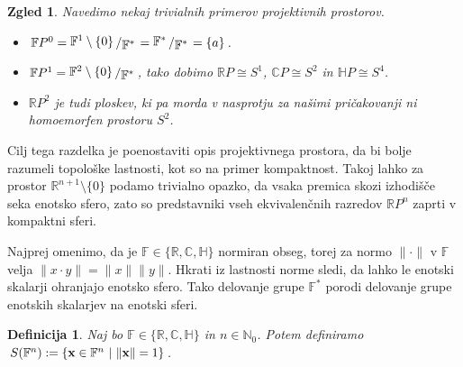 \documentclass[10pt, a4paper]{article}
\newtheorem{defi}[izr]{Definicija}
\newenvironment{noticeB}{%
  \tcolorbox[%
  notitle,
  empty,
  enhanced,  %
  breakable,
  coltext=black,
  colback=white, 
  fontupper=\rmfamily,
  noparskip,
  sharp corners,
  boxrule=-1pt,  %
  frame hidden,
  left=7pt,  %
  right=7pt,
  top=5pt,
  bottom=5pt,
  before skip=2.5ex plus 2pt,
  after skip=2.5ex plus 2pt,
  borderline west = {1.5pt}{-0.1pt}{blue!30!black}, %
  overlay unbroken and last={%
    \draw[color=black, line width=1.25pt]
    ($(frame.south west)+(1.pt, -0.1pt)$) -- ++(2em, 0);
  }
  ]}
{\endtcolorbox}
\newenvironment{definicija}{\begin{noticeB}\begin{defi}}{%
\end{defi}\end{noticeB}}
\newtheorem{zgled}[izr]{Zgled}
\newcommand{\N}{\mathbb {N}}
\newcommand{\R}{\mathbb {R}}
\newcommand{\C}{\mathbb {C}}
\newcommand{\Ha}{\mathbb {H}}
\newcommand{\F}{\mathbb {F}}
\newcommand{\quot}[2]{{\raisebox{0.1em}{$#1$}\left/\raisebox{-0.2em}{$#2$}\right.}}
\begin{document}
\begin{zgled}
  Navedimo nekaj trivialnih primerov projektivnih prostorov.
  \begin{itemize}
    \item $\F P^0 = \quot{\F^1 \setminus \{0\}}{\F^*} = \quot{\F^*}{\F^*} = \{a\}$.
    \item $\F P^1 = \quot{\F^2 \setminus \{0\}}{\F^*}$, tako dobimo $\R P \cong S^1$, $\C P \cong S^2$ in $\Ha P \cong S^4$.
    \item $\R P^2$ je tudi ploskev, ki pa morda v nasprotju za našimi pričakovanji 
    ni homoemorfen prostoru $S^2$.
  \end{itemize}
\end{zgled}

Cilj tega razdelka je poenostaviti opis projektivnega prostora, da bi bolje 
razumeli topološke lastnosti, kot so na primer kompaktnost.
Takoj lahko za prostor $\R^{n + 1} \setminus\{0\}$ podamo trivialno opazko,
da vsaka premica skozi izhodišče seka enotsko sfero,
zato so predstavniki vseh ekvivalenčnih razredov $\R P^n$
zaprti v kompaktni sferi.

Najprej omenimo, da je $\F \in \{\R, \C, \Ha\}$ normiran obseg, torej za normo 
$\| \cdot \|$ v $\F$ velja $\| x \cdot y\| = \|x\| \|y\|$.
Hkrati iz lastnosti norme sledi, da lahko le enotski skalarji ohranjajo enotsko sfero.
Tako delovanje grupe $\F^*$ porodi delovanje grupe enotskih skalarjev na enotski sferi.

\begin{definicija}
  Naj bo $\F \in \{\R, \C, \Ha\}$ in $n \in \N_0$.
  Potem definiramo $S(\F^n) := \{\vb{x} \in \F^n\ |\ \| \vb{x}\| = 1\}$.
\end{definicija}
\end{document}
